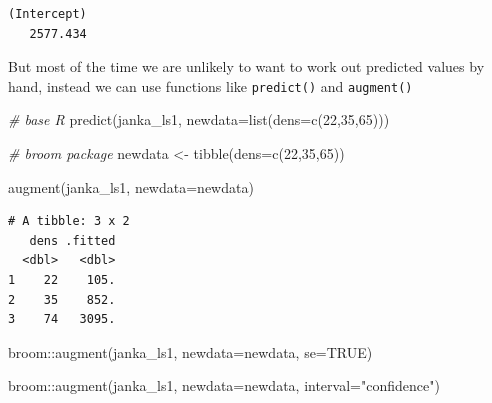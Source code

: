 \documentclass[
]{book}
\newenvironment{Shaded}{\begin{snugshade}}{\end{snugshade}}
\newcommand{\AttributeTok}[1]{\textcolor[rgb]{0.77,0.63,0.00}{#1}}
\newcommand{\CommentTok}[1]{\textcolor[rgb]{0.56,0.35,0.01}{\textit{#1}}}
\newcommand{\ConstantTok}[1]{\textcolor[rgb]{0.00,0.00,0.00}{#1}}
\newcommand{\DecValTok}[1]{\textcolor[rgb]{0.00,0.00,0.81}{#1}}
\newcommand{\FunctionTok}[1]{\textcolor[rgb]{0.00,0.00,0.00}{#1}}
\newcommand{\NormalTok}[1]{#1}
\newcommand{\OtherTok}[1]{\textcolor[rgb]{0.56,0.35,0.01}{#1}}
\newcommand{\SpecialCharTok}[1]{\textcolor[rgb]{0.00,0.00,0.00}{#1}}
\newcommand{\StringTok}[1]{\textcolor[rgb]{0.31,0.60,0.02}{#1}}
\begin{document}
\begin{verbatim}
(Intercept) 
   2577.434 
\end{verbatim}

But most of the time we are unlikely to want to work out predicted values by hand, instead we can use functions like \texttt{predict()} and \texttt{augment()}

\begin{Shaded}
\begin{Highlighting}[]
\CommentTok{\# base R}
\FunctionTok{predict}\NormalTok{(janka\_ls1, }\AttributeTok{newdata=}\FunctionTok{list}\NormalTok{(}\AttributeTok{dens=}\FunctionTok{c}\NormalTok{(}\DecValTok{22}\NormalTok{,}\DecValTok{35}\NormalTok{,}\DecValTok{65}\NormalTok{)))}
\end{Highlighting}
\end{Shaded}

\begin{Shaded}
\begin{Highlighting}[]
\CommentTok{\# broom package}
\NormalTok{newdata }\OtherTok{\textless{}{-}} \FunctionTok{tibble}\NormalTok{(}\AttributeTok{dens=}\FunctionTok{c}\NormalTok{(}\DecValTok{22}\NormalTok{,}\DecValTok{35}\NormalTok{,}\DecValTok{65}\NormalTok{))}

\FunctionTok{augment}\NormalTok{(janka\_ls1, }\AttributeTok{newdata=}\NormalTok{newdata)}
\end{Highlighting}
\end{Shaded}

\begin{verbatim}
# A tibble: 3 x 2
   dens .fitted
  <dbl>   <dbl>
1    22    105.
2    35    852.
3    74   3095.
\end{verbatim}

\begin{Shaded}
\begin{Highlighting}[]
\NormalTok{broom}\SpecialCharTok{::}\FunctionTok{augment}\NormalTok{(janka\_ls1, }\AttributeTok{newdata=}\NormalTok{newdata, }\AttributeTok{se=}\ConstantTok{TRUE}\NormalTok{)}
\end{Highlighting}
\end{Shaded}

\begin{Shaded}
\begin{Highlighting}[]
\NormalTok{broom}\SpecialCharTok{::}\FunctionTok{augment}\NormalTok{(janka\_ls1, }\AttributeTok{newdata=}\NormalTok{newdata, }\AttributeTok{interval=}\StringTok{"confidence"}\NormalTok{)}
\end{Highlighting}
\end{Shaded}
\end{document}

